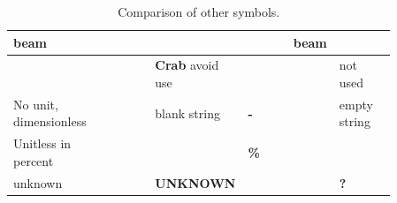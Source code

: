 \documentclass[11pt,notitlepage,onecolumn]{ivoa}
\newcommand{\unit}[1]{\textbf{\textsf{\color{orange}#1}}}
\begin{document}
\begin{table}
\begin{tabular}{|p{0.2\linewidth}|p{0.15\linewidth}|p{0.12\linewidth}|p{0.12\linewidth}|p{0.12\linewidth}|p{0.15\linewidth}|}
    beam & \unit{} & \unit{} & \unit{} & \unit{beam} &\\\hline
     & \unit{} & \unit{Crab} avoid use & \unit{} & \unit{} & not used \\\hline
    No unit, dimensionless & \unit{} & blank string & \unit{-} & \unit{} & empty string \\\hline
    Unitless in percent & \unit{} &  & \unit{\%} & \unit{} & \unit{} \\\hline
    unknown & \unit{} & {\tiny\unit{UNKNOWN}} & \unit{} & \unit{} & \unit{?} \\\hline
\end{tabular}
  \caption{Comparison of other symbols.}
  \label{tabx:comparUnitOther}
\end{table}

\clearpage

\end{document}
